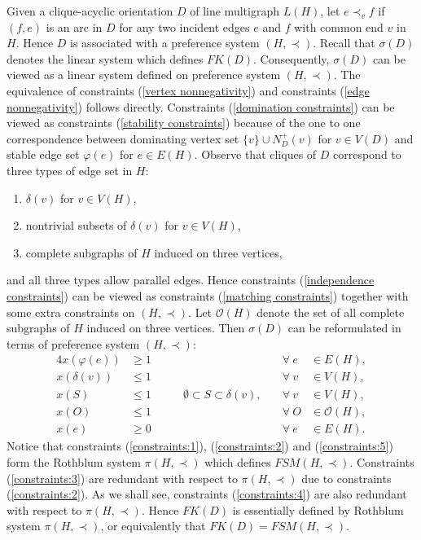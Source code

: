 \documentclass[11pt]{article}
\numberwithin{theorem}{section}
\begin{document}
Given a clique-acyclic orientation $D$ of line multigraph $L(H)$,
let $e\prec_v f$ if $(f,e)$ is an arc in $D$ for any two incident edges $e$ and $f$ with common end $v$ in $H$.
Hence $D$ is associated with a preference system $(H,\prec)$.
Recall that $\sigma(D)$ denotes the linear system which defines $FK(D)$.
Consequently, $\sigma(D)$ can be viewed as a linear system defined on preference system $(H,\prec)$.
The equivalence of constraints (\ref{vertex nonnegativity}) and constraints (\ref{edge nonnegativity}) follows directly. Constraints (\ref{domination constraints}) can be viewed as constraints (\ref{stability constraints}) because of the one to one correspondence between dominating vertex set $\{v\}\cup N^+_D(v)$ for $v\in V(D)$ and stable edge set $\varphi(e)$ for $e\in E(H)$.
Observe that cliques of $D$ correspond to three types of edge set in $H$:
\begin{enumerate}[label={(\alph*)}, itemsep=0.2mm]
\item $\delta(v)$ for $v\in V(H)$,
\item nontrivial subsets of $\delta(v)$ for $v\in V(H)$,
\item complete subgraphs of $H$ induced on three vertices,
\end{enumerate}
and all three types allow parallel edges.
Hence constraints (\ref{independence constraints}) can be viewed as constraints (\ref{matching constraints}) together with some extra constraints on $(H,\prec)$. Let $\mathcal{O}(H)$ denote the set of all complete subgraphs of $H$ induced on three vertices.
Then $\sigma(D)$ can be reformulated in terms of preference system $(H,\prec)$:
\begin{alignat}{4}
x(\varphi(e)) &\geq 1 &\qquad &\forall ~e &\in E(H),\label{constraints:1}\\
x(\delta(v)) &\leq 1 &\qquad &\forall ~v &\in V(H),\label{constraints:2}\\
x(S) &\leq 1 &\qquad \emptyset\subset S\subset \delta(v),\quad &\forall ~v&\in V(H),\label{constraints:3}\\
x(O) &\leq 1 &\qquad &\forall ~O&\in \mathcal{O}(H),\label{constraints:4}\\
x(e) &\geq 0 &\qquad &\forall ~e &\in E(H)\label{constraints:5}.
\end{alignat}
Notice that constraints (\ref{constraints:1}), (\ref{constraints:2}) and (\ref{constraints:5}) form the Rothblum system $\pi(H,\prec)$ which defines $FSM(H,\prec)$.
Constraints (\ref{constraints:3}) are redundant with respect to $\pi(H,\prec)$ due to constraints (\ref{constraints:2}).
As we shall see, constraints (\ref{constraints:4}) are also redundant with respect to $\pi(H,\prec)$.
Hence $FK(D)$ is essentially defined by Rothblum system $\pi(H,\prec)$, or equivalently that $FK(D)=FSM(H,\prec)$.
\end{document}

